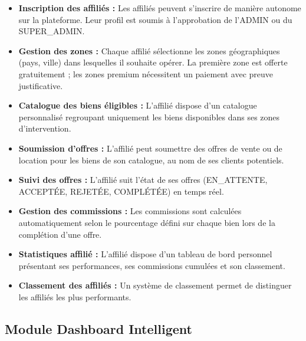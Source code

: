 \documentclass[a4paper,12pt]{report}
\begin{document}
\begin{itemize}
    \item \textbf{Inscription des affiliés :} Les affiliés peuvent s'inscrire de manière autonome sur la plateforme. Leur profil est soumis à l'approbation de l'ADMIN ou du SUPER\_ADMIN.
    \item \textbf{Gestion des zones :} Chaque affilié sélectionne les zones géographiques (pays, ville) dans lesquelles il souhaite opérer. La première zone est offerte gratuitement ; les zones premium nécessitent un paiement avec preuve justificative.
    \item \textbf{Catalogue des biens éligibles :} L'affilié dispose d'un catalogue personnalisé regroupant uniquement les biens disponibles dans ses zones d'intervention.
    \item \textbf{Soumission d'offres :} L'affilié peut soumettre des offres de vente ou de location pour les biens de son catalogue, au nom de ses clients potentiels.
    \item \textbf{Suivi des offres :} L'affilié suit l'état de ses offres (EN\_ATTENTE, ACCEPTÉE, REJETÉE, COMPLÉTÉE) en temps réel.
    \item \textbf{Gestion des commissions :} Les commissions sont calculées automatiquement selon le pourcentage défini sur chaque bien lors de la complétion d'une offre.
    \item \textbf{Statistiques affilié :} L'affilié dispose d'un tableau de bord personnel présentant ses performances, ses commissions cumulées et son classement.
    \item \textbf{Classement des affiliés :} Un système de classement permet de distinguer les affiliés les plus performants.
\end{itemize}

\subsection{Module Dashboard Intelligent}
\end{document}
